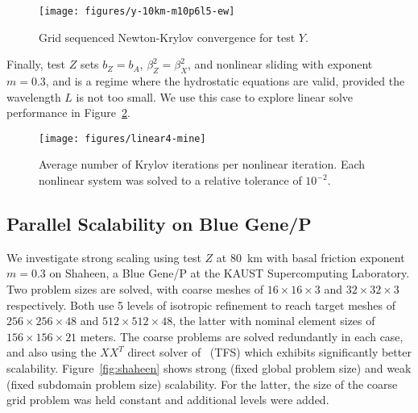 \documentclass[3p]{elsarticle}
\begin{document}
\begin{figure}
  \centering\caption{Grid sequenced Newton-Krylov convergence for test $Y$.}\label{fig:testy}
  \texttt{[image: figures/y-10km-m10p6l5-ew]}
\end{figure}

Finally, test $Z$ sets $b_Z = b_A$, $\beta_Z^2 = \beta_X^2$, and nonlinear sliding with exponent $m=0.3$, and is a regime where the hydrostatic equations are valid, provided the wavelength $L$ is not too small.  We use this case to explore linear solve performance in Figure~\ref{fig:linear}.

\begin{figure}
  \centering\caption{Average number of Krylov iterations per nonlinear iteration.  Each nonlinear system was solved to a relative tolerance of $10^{-2}$.}\label{fig:linear}
  \texttt{[image: figures/linear4-mine]}
\end{figure}

\subsection{Parallel Scalability on Blue Gene/P}\label{sec:pscaling}
We investigate strong scaling using test $Z$ at \SI{80}{\kilo\metre} with basal friction exponent $m= 0.3$ on Shaheen, a Blue Gene/P at the KAUST Supercomputing Laboratory.  Two problem sizes are solved, with coarse meshes of $16\times 16\times 3$ and $32\times 32\times 3$ respectively.  Both use 5 levels of isotropic refinement to reach target meshes of $256\times 256\times 48$ and $512\times 512\times 48$, the latter with nominal element sizes of $156\times 156\times 21$ meters.  The coarse problems are solved redundantly in each case, and also using the $XX^T$ direct solver of~\cite{tufo2001fast} (TFS) which exhibits significantly better scalability.  Figure~\ref{fig:shaheen} shows strong (fixed global problem size) and weak (fixed subdomain problem size) scalability. For the latter, the size of the coarse grid problem was held constant and additional levels were added.
\end{document}
